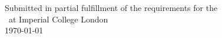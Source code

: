 \begin{titlepage}
\vfill %
Submitted in partial fulfillment of the requirements for the \\ \degreetype~at Imperial College London\\[0.5cm]

\makeatletter
{\large \today}\\[2cm] %
\makeatother

\end{titlepage}